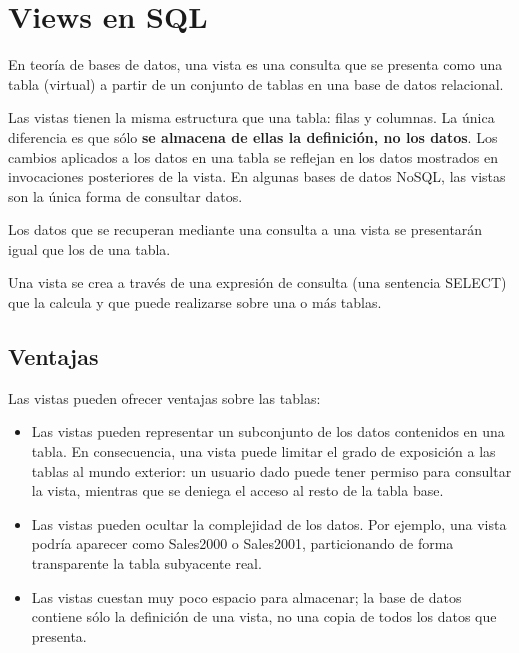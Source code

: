\documentclass[12pt, fleqn]{report}                             %
\begin{document}
    \section{Views en SQL}


        En teoría de bases de datos, una vista es una consulta que se presenta como una tabla (virtual)
        a partir de un conjunto de tablas en una base de datos relacional.

        Las vistas tienen la misma estructura que una tabla: filas y columnas.
        La única diferencia es que sólo \textbf{se almacena de ellas la definición, no los datos}.
        Los cambios aplicados a los datos en una tabla se reflejan en los datos mostrados en invocaciones
        posteriores de la vista.
        En algunas bases de datos NoSQL, las vistas son la única forma de consultar datos.

        Los datos que se recuperan mediante una consulta a una vista se presentarán igual que los de una tabla.

        Una vista se crea a través de una expresión de consulta (una sentencia SELECT) que la calcula y que puede
        realizarse sobre una o más tablas.


        \subsection{Ventajas}

            Las vistas pueden ofrecer ventajas sobre las tablas:

            \begin{itemize}

                \item
                    Las vistas pueden representar un subconjunto de los datos contenidos en una tabla.
                    En consecuencia, una vista puede limitar el grado de exposición a las tablas al mundo exterior:
                    un usuario dado puede tener permiso para consultar la vista, mientras que se deniega el acceso
                    al resto de la tabla base.

                \item
                    Las vistas pueden ocultar la complejidad de los datos.
                    Por ejemplo, una vista podría aparecer como Sales2000 o Sales2001, particionando
                    de forma transparente la tabla subyacente real.

                \item 
                    Las vistas cuestan muy poco espacio para almacenar; la base de datos contiene sólo
                    la definición de una vista, no una copia de todos los datos que presenta.

            \end{itemize}
\end{document}
